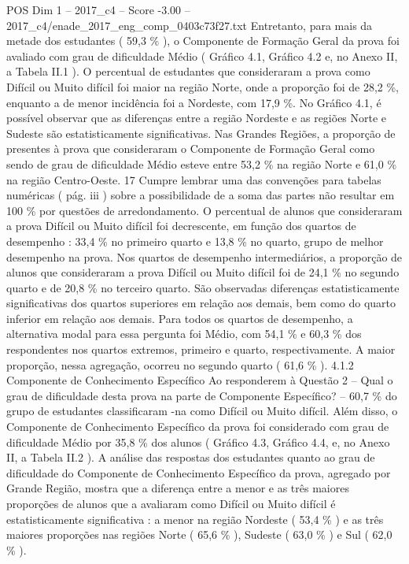 \begin{textsample}{POS Dim 1 – 2017\_c4 – Score -3.00 – 2017\_c4/enade\_2017\_eng\_comp\_0403c73f27.txt}
Entretanto, para mais da metade dos estudantes ( 59,3 \% ), o Componente de Formação Geral da prova foi avaliado com grau de dificuldade Médio ( Gráfico 4.1, Gráfico 4.2 e, no Anexo II, a Tabela II.1 ).
O percentual de estudantes que consideraram a prova como Difícil ou Muito difícil foi maior na região Norte, onde a proporção foi de 28,2 \%, enquanto a de menor incidência foi a Nordeste, com 17,9 \%.
No Gráfico 4.1, é possível observar que as diferenças entre a região Nordeste e as regiões Norte e Sudeste são estatisticamente significativas.
Nas Grandes Regiões, a proporção de presentes à prova que consideraram o Componente de Formação Geral como sendo de grau de dificuldade Médio esteve entre 53,2 \% na região Norte e 61,0 \% na região Centro-Oeste. 17 Cumpre lembrar uma das convenções para tabelas numéricas ( pág. iii ) sobre a possibilidade de a soma das partes não resultar em 100 \% por questões de arredondamento.
O percentual de alunos que consideraram a prova Difícil ou Muito difícil foi decrescente, em função dos quartos de desempenho : 33,4 \% no primeiro quarto e 13,8 \% no quarto, grupo de melhor desempenho na prova.
Nos quartos de desempenho intermediários, a proporção de alunos que consideraram a prova Difícil ou Muito difícil foi de 24,1 \% no segundo quarto e de 20,8 \% no terceiro quarto.
São observadas diferenças estatisticamente significativas dos quartos superiores em relação aos demais, bem como do quarto inferior em relação aos demais.
Para todos os quartos de desempenho, a alternativa modal para essa pergunta foi Médio, com 54,1 \% e 60,3 \% dos respondentes nos quartos extremos, primeiro e quarto, respectivamente.
A maior proporção, nessa agregação, ocorreu no segundo quarto ( 61,6 \% ). 4.1.2 Componente de Conhecimento Específico Ao responderem à Questão 2 – Qual o grau de dificuldade desta prova na parte de Componente Específico? – 60,7 \% do grupo de estudantes classificaram -na como Difícil ou Muito difícil.
Além disso, o Componente de Conhecimento Específico da prova foi considerado com grau de dificuldade Médio por 35,8 \% dos alunos ( Gráfico 4.3, Gráfico 4.4, e, no Anexo II, a Tabela II.2 ).
A análise das respostas dos estudantes quanto ao grau de dificuldade do Componente de Conhecimento Específico da prova, agregado por Grande Região, mostra que a diferença entre a menor e as três maiores proporções de alunos que a avaliaram como Difícil ou Muito difícil é estatisticamente significativa : a menor na região Nordeste ( 53,4 \% ) e as três maiores proporções nas regiões Norte ( 65,6 \% ), Sudeste ( 63,0 \% ) e Sul ( 62,0 \% ).

\end{textsample}
